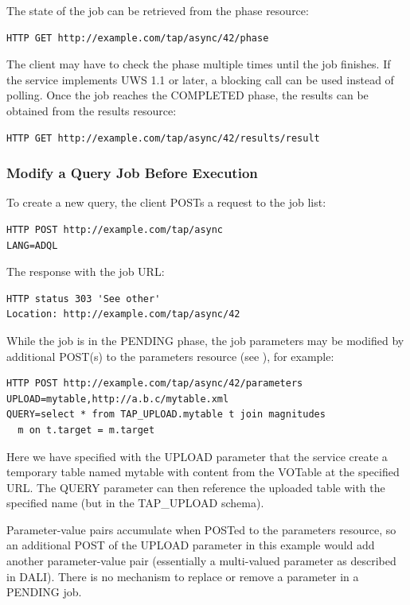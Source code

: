 \documentclass[11pt,letter]{ivoa}
\newcommand{\tapupload}{TAP\_UPLOAD}
\newcommand{\tapupload}{%
  {\relsize{-0.5}TAP\discretionary{-}{}{\kern-2pt\_}UPLOAD}}
\begin{document}
The state of the job can be retrieved from the phase resource:

\begin{verbatim}
HTTP GET http://example.com/tap/async/42/phase
\end{verbatim}

The client may have to check the phase multiple times until the job 
finishes. If the service implements UWS 1.1 \citep{std:UWS11} or later, a blocking call
can be used instead of polling. Once the job reaches the COMPLETED phase, 
the results can be obtained from the results resource:

\begin{verbatim}
HTTP GET http://example.com/tap/async/42/results/result
\end{verbatim}

\subsubsection{Modify a Query Job Before Execution}
To create a new query, the client POSTs a request to the job list:

\begin{verbatim}
HTTP POST http://example.com/tap/async
LANG=ADQL
\end{verbatim}

The response with the job URL:

\begin{verbatim}
HTTP status 303 'See other'
Location: http://example.com/tap/async/42
\end{verbatim}

While the job is in the PENDING phase, the job parameters may be modified 
by additional POST(s) to the parameters resource (see 
\citet{std:DALI11}), for example:

\begin{verbatim}
HTTP POST http://example.com/tap/async/42/parameters
UPLOAD=mytable,http://a.b.c/mytable.xml
QUERY=select * from TAP_UPLOAD.mytable t join magnitudes 
  m on t.target = m.target
\end{verbatim}

Here we have specified with the UPLOAD parameter that the service create a 
temporary table named mytable with content from the VOTable at the specified 
URL. The QUERY parameter can then reference the uploaded table with the 
specified name (but in the \tapupload{} schema).

Parameter-value pairs accumulate when POSTed to the parameters resource, so an 
additional POST of the UPLOAD parameter in this example would add another 
parameter-value pair (essentially a multi-valued parameter as described in 
DALI). There is no mechanism to replace or remove a parameter in a 
PENDING job.
\end{document}
